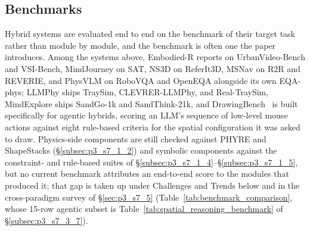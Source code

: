 
\subsection{Benchmarks}
\label{subsec:p3-sec7-4-benchmarks}
Hybrid systems are evaluated end to end on the benchmark of their target task rather than module by module, and the benchmark is often one the paper introduces.
Among the systems above, Embodied-R reports on UrbanVideo-Bench and VSI-Bench, MindJourney on SAT, NS3D on ReferIt3D, MSNav on R2R and REVERIE, and PhysVLM on RoboVQA and OpenEQA alongside its own EQA-phys; LLMPhy ships TraySim, CLEVRER-LLMPhy, and Real-TraySim, MindExplore ships SandGo-1k and SandThink-21k, and DrawingBench~\cite{kim2025drawingbench} is built specifically for agentic hybrids, scoring an LLM's sequence of low-level mouse actions against eight rule-based criteria for the spatial configuration it was asked to draw.
Physics-side components are still checked against PHYRE and ShapeStacks (§\ref{subsec:p3_s7_1_2}) and symbolic components against the constraint- and rule-based suites of §\ref{subsec:p3_s7_1_4}--§\ref{subsec:p3_s7_1_5}, but no current benchmark attributes an end-to-end score to the modules that produced it; that gap is taken up under Challenges and Trends below and in the cross-paradigm survey of §\ref{sec:p3_s7_5} (Table~\ref{tab:benchmark_comparison}, whose 15-row agentic subset is Table~\ref{tab:spatial_reasoning_benchmark} of §\ref{subsec:p3_s7_3_7}).

